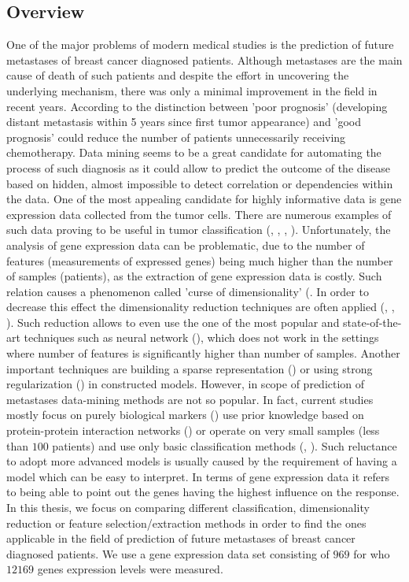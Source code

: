 \documentclass[12pt, wide]{mwart}
\begin{document}
\subsection{Overview}
One of the major problems of modern medical studies is the prediction of future metastases of breast cancer diagnosed patients. Although metastases are the main cause of death of such patients and despite the effort in uncovering the underlying mechanism, there was only a minimal improvement in the field in recent years. According to \cite{Metastasis1} the distinction between 'poor prognosis' (developing distant metastasis within 5 years since first tumor appearance) and 'good prognosis' could reduce the number of patients unnecessarily receiving chemotherapy. Data mining seems to be a great candidate for automating the process of such diagnosis as it could allow to predict the outcome of the disease based on hidden, almost impossible to detect correlation or dependencies within the data. One of the most appealing candidate for highly informative data is gene expression data collected from the tumor cells. There are numerous examples of such data proving to be useful in tumor classification (\cite{BreastCancerClassification}, \cite{TumorMolecularClass}, \cite{TumorsClass1}, \cite{TumorClass2}). Unfortunately, the analysis of gene expression data can be problematic, due to the number of features (measurements of expressed genes) being much higher than the number of samples (patients), as the extraction of gene expression data is costly. Such relation causes a phenomenon called 'curse of dimensionality' (\cite[p. 22-26]{ESL2}. In order to decrease this effect the dimensionality reduction techniques are often applied (\cite{MasterArts}, \cite{TumorClass4}, \cite{TumorPLS}). Such reduction allows to even use the one of the most popular and state-of-the-art techniques such as neural network (\cite{fDNN}), which does not work in the settings where number of features is significantly higher than number of samples. Another important techniques are building a sparse representation (\cite{TumorClass3}) or using strong regularization (\cite[p. 649-666]{ESL2}) in constructed models. However, in scope of prediction of metastases data-mining methods are not so popular. In fact, current studies mostly focus on purely biological markers (\cite{Metastasis4}) use prior knowledge based on protein-protein interaction networks (\cite{MetastasisScores}) or operate on very small samples (less than $100$ patients) and use only basic classification methods (\cite{Metastasis1}, \cite{Metastasis2}). Such reluctance to adopt more advanced models is usually caused by the requirement of having a model which can be easy to interpret. In terms of gene expression data it refers to being able to point out the genes having the highest influence on the response. In this thesis, we focus on comparing different classification, dimensionality reduction or feature selection/extraction methods in order to find the ones applicable in the field of prediction of future metastases of breast cancer diagnosed patients. We use a gene expression data set consisting of $969$ for who $12169$ genes expression levels were measured.
\end{document}
